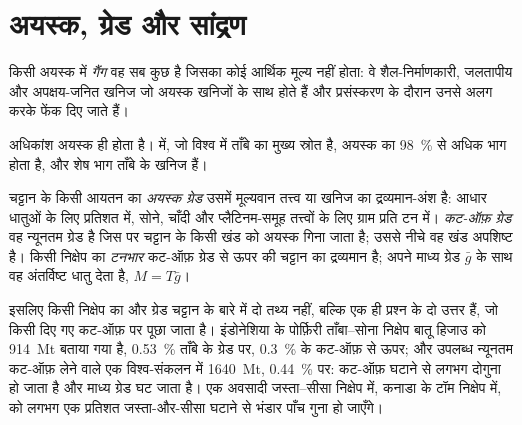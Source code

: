 \section{अयस्क, ग्रेड और सांद्रण}\label{sec:b2:ore-deposits:grade}

\begin{definition}[गैंग]\label{def:b2:ore-deposits:ore}
किसी अयस्क में \emph{गैंग} वह सब कुछ है जिसका कोई आर्थिक मूल्य नहीं होता: वे
शैल-निर्माणकारी, जलतापीय और अपक्षय-जनित खनिज जो अयस्क खनिजों के साथ होते हैं और प्रसंस्करण के दौरान
उनसे अलग करके फेंक दिए जाते हैं।
\end{definition}

अधिकांश अयस्क  ही होता है।  में, जो विश्व में ताँबे का मुख्य स्रोत है, अयस्क का
\qty{98}{\percent} से अधिक भाग  होता है, और शेष भाग ताँबे के खनिज हैं।

\begin{definition}\label{def:b2:ore-deposits:grade}
चट्टान के किसी आयतन का \emph{अयस्क ग्रेड} उसमें मूल्यवान तत्त्व या खनिज का
द्रव्यमान-अंश है: आधार धातुओं के लिए प्रतिशत में, सोने, चाँदी और प्लैटिनम-समूह तत्त्वों के लिए ग्राम
प्रति टन में। \emph{कट-ऑफ़ ग्रेड} वह न्यूनतम ग्रेड है जिस पर चट्टान के किसी खंड को
अयस्क गिना जाता है; उससे नीचे वह खंड अपशिष्ट है। किसी निक्षेप का
\emph{टनभार} कट-ऑफ़ ग्रेड से ऊपर की चट्टान का द्रव्यमान है; अपने माध्य ग्रेड $\bar g$ के
साथ वह अंतर्विष्ट धातु देता है, $M = T\bar g$।
\end{definition}

इसलिए किसी निक्षेप का  और ग्रेड चट्टान के बारे में दो तथ्य नहीं, बल्कि एक ही प्रश्न के दो उत्तर हैं,
जो किसी दिए गए कट-ऑफ़ पर पूछा जाता है। इंडोनेशिया के पोर्फ़िरी ताँबा--सोना निक्षेप बातू हिजाउ को
\qty{914}{Mt} बताया गया है, \qty{0.53}{\percent} ताँबे के ग्रेड पर, \qty{0.3}{\percent} के कट-ऑफ़ से ऊपर;
और उपलब्ध न्यूनतम कट-ऑफ़ लेने वाले एक विश्व-संकलन में \qty{1640}{Mt}, \qty{0.44}{\percent} पर: कट-ऑफ़
घटाने से  लगभग दोगुना हो जाता है और माध्य ग्रेड घट जाता है। एक अवसादी जस्ता--सीसा निक्षेप में,
कनाडा के टॉम निक्षेप में,  को लगभग एक प्रतिशत जस्ता-और-सीसा घटाने से
भंडार पाँच गुना हो जाएँगे।

